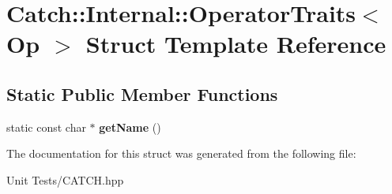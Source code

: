\hypertarget{structCatch_1_1Internal_1_1OperatorTraits}{}\section{Catch\+:\+:Internal\+:\+:Operator\+Traits$<$ Op $>$ Struct Template Reference}
\label{structCatch_1_1Internal_1_1OperatorTraits}
\subsection*{Static Public Member Functions}
\begin{DoxyCompactItemize}
\item 
static const char $\ast$ {\bfseries get\+Name} ()\hypertarget{structCatch_1_1Internal_1_1OperatorTraits_ac6d08082ea33348d42bc4ccbd6d07671}{}\label{structCatch_1_1Internal_1_1OperatorTraits_ac6d08082ea33348d42bc4ccbd6d07671}

\end{DoxyCompactItemize}


The documentation for this struct was generated from the following file\+:\begin{DoxyCompactItemize}
\item 
Unit Tests/C\+A\+T\+C\+H.\+hpp\end{DoxyCompactItemize}
